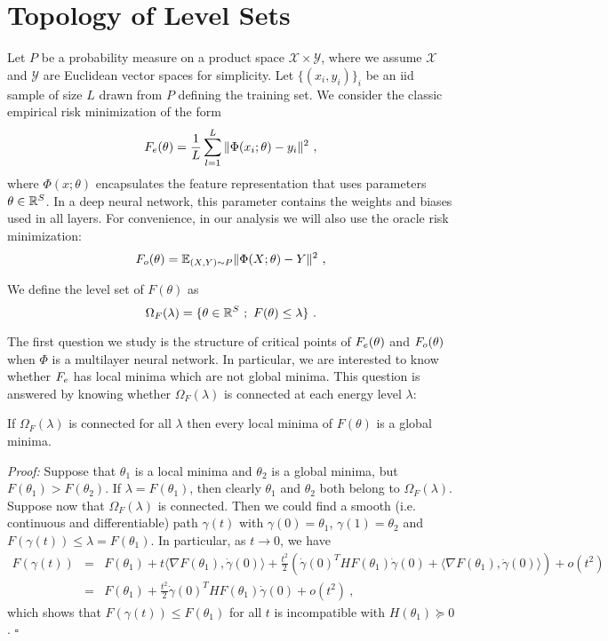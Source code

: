 \section{Topology of Level Sets}

Let $P$ be a probability measure on a product space $\mathcal{X} \times \mathcal{Y}$, 
where we assume $\mathcal{X}$ and $\mathcal{Y}$ are Euclidean vector spaces for simplicity.
Let $\{ (x_i, y_i)\}_i$ be an iid sample of size $L$ drawn from $P$ defining the training set.
We consider the classic empirical risk minimization of the form
\begin{equation}
\label{emp_risk_min}
F_{e}(\theta) = \frac{1}{L} \sum_{l=1}^L \| \Phi(x_i;\theta) - y_i \|^2~,
\end{equation}
where $\Phi(x ; \theta)$ encapsulates the feature representation 
that uses parameters $\theta \in {\mathbb{R}}^S$. In a deep neural network, this parameter
contains the weights and biases used in all layers.
For convenience, in our analysis we will also use the oracle risk minimization:
\begin{equation}
\label{risk_min}
F_{o}(\theta) = {\mathbb{E}}_{(X,Y) \sim P} \| \Phi(X;\theta) - Y \|^2~,
\end{equation}

We define the level set of $F(\theta)$ as 
\begin{equation}
\Omega_F(\lambda) = \{ \theta \in {\mathbb{R}}^S~;~F(\theta) \leq \lambda \}~. 
\end{equation}

The first question we study is the structure of critical points of $F_{e}(\theta)$ and $F_{o}(\theta)$
when $\Phi$ is a multilayer neural network. In particular, we are interested to know whether
$F_{e}$ has local minima which are not global minima. This question is answered by 
knowing whether $\Omega_F(\lambda)$ is connected at each energy level $\lambda$:

\begin{proposition}
If $\Omega_F(\lambda)$ is connected for all $\lambda$ then every local minima of $F(\theta)$ is a global minima. 
\end{proposition}
{\it Proof:} Suppose that $\theta_1$ is a local minima and $\theta_2$ is a global minima, 
but $F(\theta_1) > F(\theta_2)$. If $\lambda = F(\theta_1)$, then clearly 
$\theta_1$ and $\theta_2$ both belong to $\Omega_F(\lambda)$. Suppose 
now that $\Omega_F(\lambda)$ 
is connected. Then we could find a smooth (i.e. continuous and differentiable) path $\gamma(t)$ 
with $\gamma(0) = \theta_1$, $\gamma(1)= \theta_2$ and $F(\gamma(t)) \leq \lambda = F(\theta_1)$.
In particular, as $t \to 0$, we have
\begin{eqnarray*}
F(\gamma(t)) &=& F(\theta_1) + t \langle \nabla F(\theta_1) , \dot{\gamma}(0) \rangle + \frac{t^2}{2} \left(\dot{\gamma}(0)^T H F(\theta_1) \dot{\gamma}(0) + \langle \nabla F(\theta_1), \ddot{\gamma}(0) \rangle \right) + o(t^2) \\
&=& F(\theta_1) +   \frac{t^2}{2}  \dot{\gamma}(0)^T H F(\theta_1) \dot{\gamma}(0)  + o(t^2) ~,
\end{eqnarray*}
which shows that $F(\gamma(t)) \leq F(\theta_1)$ for all $t$ is incompatible with $H(\theta_1) \succeq 0$. $\square$


